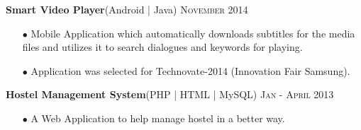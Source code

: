 \documentclass[letterpaper,11pt]{article}
\begin{document}
\normalsize{\textbf {Smart Video Player}(Android | Java) } \hfill{\textsc{November 2014}}
{
\begin{itemize}\setlength{\itemsep}{-1pt}
        \item [$\bullet$]Mobile Application which automatically downloads subtitles for the media files and utilizes it  to search dialogues and keywords for playing.
        \item[$\bullet$]Application was selected for Technovate-2014 (Innovation Fair Samsung).\\[-3mm]
 \end{itemize}
}

\normalsize{\textbf {Hostel Management System}(PHP | HTML | MySQL)} \hfill{\textsc{Jan - April 2013}}
{
\begin{itemize}\setlength{\itemsep}{-1pt}
        \item [$\bullet$] A Web Application to help manage hostel in a better way. \\[-3mm]
 \end{itemize}
}
\end{document}
